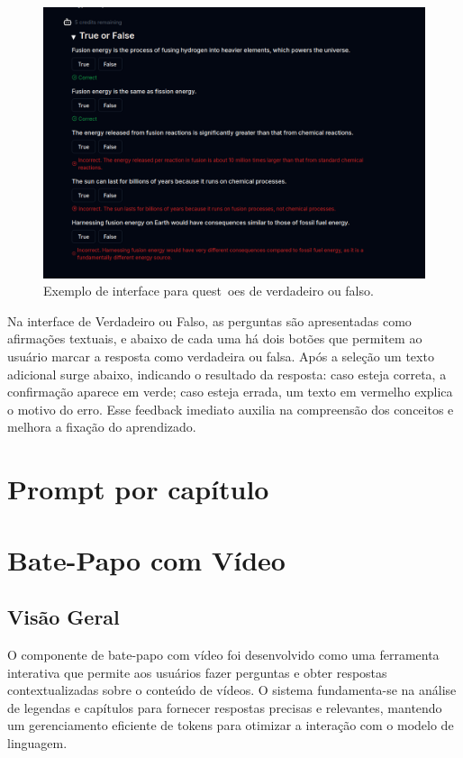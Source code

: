 \documentclass[tcc,capa]{texufpel}
\begin{document}
\begin{figure}[H]
\centering
\includegraphics[width=\textwidth,height=0.45\textheight,keepaspectratio]{exemplo-slides/graphics/images/true_or_false.png}
\caption{Exemplo de interface para quest~oes de verdadeiro ou falso.}
\label{fig:true_false_interface}
\end{figure}

Na interface de Verdadeiro ou Falso, as perguntas são apresentadas como afirmações textuais, e abaixo de cada uma há dois botões que permitem ao usuário marcar a resposta como verdadeira ou falsa. Após a seleção um texto adicional surge abaixo, indicando o resultado da resposta: caso esteja correta, a confirmação aparece em verde; caso esteja errada, um texto em vermelho explica o motivo do erro. Esse feedback imediato auxilia na compreensão dos conceitos e melhora a fixação do aprendizado.




\section{Prompt por capítulo}


\section{Bate-Papo com Vídeo}

\subsection{Visão Geral}
O componente de bate-papo com vídeo foi desenvolvido como uma ferramenta interativa que permite aos usuários fazer perguntas e obter respostas contextualizadas sobre o conteúdo de vídeos. O sistema fundamenta-se na análise de legendas e capítulos para fornecer respostas precisas e relevantes, mantendo um gerenciamento eficiente de tokens para otimizar a interação com o modelo de linguagem.
\end{document}
